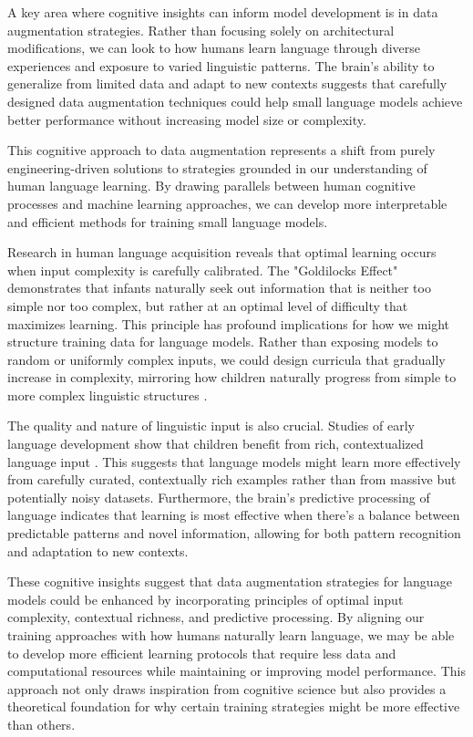 A key area where cognitive insights can inform model development is in data augmentation strategies. Rather than focusing solely on architectural modifications, we can look to how humans learn language through diverse experiences and exposure to varied linguistic patterns. The brain's ability to generalize from limited data and adapt to new contexts suggests that carefully designed data augmentation techniques could help small language models achieve better performance without increasing model size or complexity.

This cognitive approach to data augmentation represents a shift from purely engineering-driven solutions to strategies grounded in our understanding of human language learning. By drawing parallels between human cognitive processes and machine learning approaches, we can develop more interpretable and efficient methods for training small language models.

Research in human language acquisition reveals that optimal learning occurs when input complexity is carefully calibrated. The "Goldilocks Effect" \cite{kidd2012goldilocks} demonstrates that infants naturally seek out information that is neither too simple nor too complex, but rather at an optimal level of difficulty that maximizes learning. This principle has profound implications for how we might structure training data for language models. Rather than exposing models to random or uniformly complex inputs, we could design curricula that gradually increase in complexity, mirroring how children naturally progress from simple to more complex linguistic structures \cite{clark2015first}.

The quality and nature of linguistic input is also crucial. Studies of early language development show that children benefit from rich, contextualized language input \cite{bergelson2015early, weizman2001lexical}. This suggests that language models might learn more effectively from carefully curated, contextually rich examples rather than from massive but potentially noisy datasets. Furthermore, the brain's predictive processing of language \cite{caucheteux2023evidence} indicates that learning is most effective when there's a balance between predictable patterns and novel information, allowing for both pattern recognition and adaptation to new contexts.

These cognitive insights suggest that data augmentation strategies for language models could be enhanced by incorporating principles of optimal input complexity, contextual richness, and predictive processing. By aligning our training approaches with how humans naturally learn language, we may be able to develop more efficient learning protocols that require less data and computational resources while maintaining or improving model performance. This approach not only draws inspiration from cognitive science but also provides a theoretical foundation for why certain training strategies might be more effective than others.


